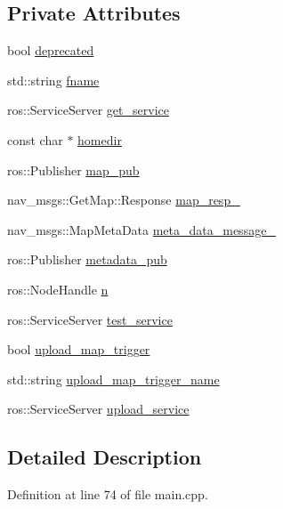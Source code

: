 \subsection*{Private Attributes}
\begin{DoxyCompactItemize}
\item 
bool \hyperlink{classMapServer_a14e98192ccb9b3750ec15ab9bc504c89}{deprecated}
\item 
std\-::string \hyperlink{classMapServer_ad6965ce117f3fd625ee154c9401adbd1}{fname}
\item 
ros\-::\-Service\-Server \hyperlink{classMapServer_a9cf3f0c9eb77614d824d11a8b0e26494}{get\-\_\-service}
\item 
const char $\ast$ \hyperlink{classMapServer_afb9e1200e8b84b9cbc1e2d9fa9bb4f82}{homedir}
\item 
ros\-::\-Publisher \hyperlink{classMapServer_a470be44b3a485ea9650f7b39bc41cb4b}{map\-\_\-pub}
\item 
nav\-\_\-msgs\-::\-Get\-Map\-::\-Response \hyperlink{classMapServer_ac1be64f4c32a295b8a0bd09e716aeb42}{map\-\_\-resp\-\_\-}
\item 
nav\-\_\-msgs\-::\-Map\-Meta\-Data \hyperlink{classMapServer_a5aca513fe2a230e89e41f700703ee477}{meta\-\_\-data\-\_\-message\-\_\-}
\item 
ros\-::\-Publisher \hyperlink{classMapServer_a39b9c75c5bb3ca55346ba696b9cdcbb0}{metadata\-\_\-pub}
\item 
ros\-::\-Node\-Handle \hyperlink{classMapServer_a819c2adc93d1cb5175509f939de80b73}{n}
\item 
ros\-::\-Service\-Server \hyperlink{classMapServer_a2f853a0cd5519cae4ad0975bd82b5e43}{test\-\_\-service}
\item 
bool \hyperlink{classMapServer_a474607e20044b6f1bd25c82cb26df12c}{upload\-\_\-map\-\_\-trigger}
\item 
std\-::string \hyperlink{classMapServer_a07c4ad578d29ad41fb12cdb89883c9ad}{upload\-\_\-map\-\_\-trigger\-\_\-name}
\item 
ros\-::\-Service\-Server \hyperlink{classMapServer_a69f6590f7c64f1e2f95f252ec9613406}{upload\-\_\-service}
\end{DoxyCompactItemize}


\subsection{Detailed Description}


Definition at line 74 of file main.\-cpp.



